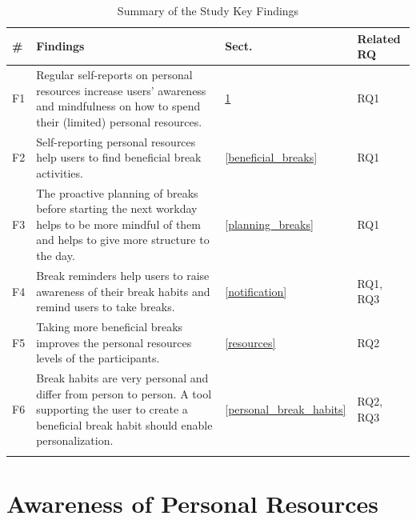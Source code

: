 \documentclass{hasel_thesis}
\begin{document}
\begin{table}[ht] 
 \caption{Summary of the Study Key Findings}
    \begin{tabular}{ |p{1cm} p{10cm} p{1cm} p{2cm}|  }
    \hline
     \# & Findings & Sect. & Related RQ\\
     \hline
     \rowcolor{Gray}
     F1 &   Regular self-reports on personal resources increase users' awareness and mindfulness on how to spend their (limited) personal resources. & \ref{awareness_resources} & RQ1\\
     F2 &   Self-reporting personal resources help users to find beneficial break activities. & \ref{beneficial_breaks} & RQ1\\
     \rowcolor{Gray}
     F3 &   The proactive planning of breaks before starting the next workday helps to be more mindful of them and helps to give more structure to the day. & \ref{planning_breaks} & RQ1\\
     F4 &   Break reminders help users to raise awareness of their break habits and remind users to take breaks. & \ref{notification} & RQ1, RQ3 \\
     \rowcolor{Gray}
     F5 &   Taking more beneficial breaks improves the personal resources levels of the participants. & \ref{resources} & RQ2\\
     F6 &   Break habits are very personal and differ from person to person. A tool supporting the user to create a beneficial break habit should enable personalization. & \ref{personal_break_habits} & RQ2, RQ3\\
      \rowcolor{Gray}
     \hline
     
    \end{tabular}
 \label{table:key_findings}
\end{table}

\section{Awareness of Personal Resources} \label{awareness_resources}

\end{document}
